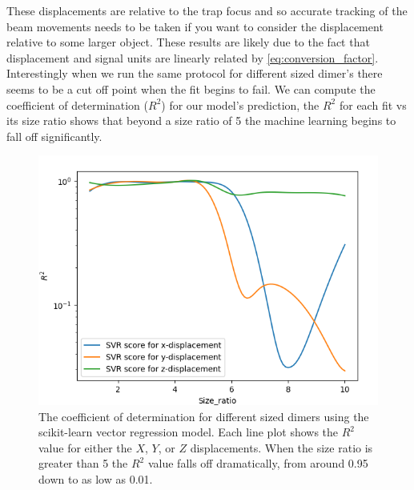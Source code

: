 These displacements are relative to the trap focus and 
so accurate tracking of the beam movements needs to be taken if 
you want to consider the displacement relative to some larger object. 
These results are likely due to the fact that displacement and 
signal units are linearly related by \eqref{eq:conversion_factor}. Interestingly when we run the same protocol for different sized 
dimer's there seems to be a cut off point when the fit begins to 
fail. We can compute the coefficient of determination ($R^2$) for 
our model's prediction, the $R^2$ for each fit vs its size ratio 
shows that beyond a size ratio of 5 the machine learning begins 
to fall off significantly.
\begin{figure}[h!]
	\centering
	\includegraphics[width=\linewidth]{score_results.png}
	\caption{The coefficient of determination for different sized 
	dimers using the scikit-learn vector regression model. Each line
	plot shows the $R^2$ value for either the $X$, $Y$, or $Z$ 
	displacements. When the size ratio is greater than 5 the $R^2$ 
	value falls off dramatically, from around 0.95 down to as low as 
	0.01.}
\end{figure}

